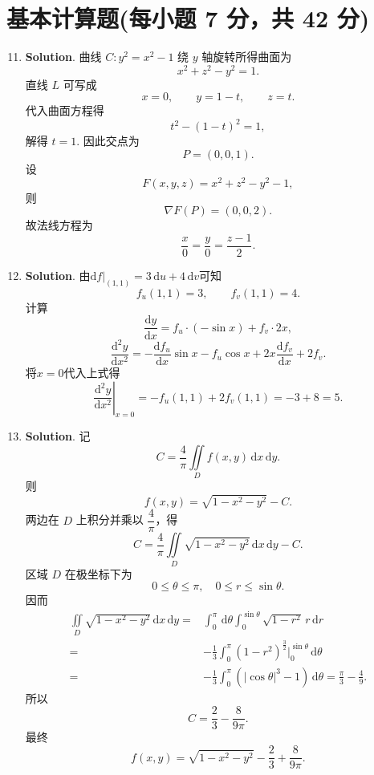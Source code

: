 \documentclass[../main.tex]{subfiles}
\begin{document}
\section{基本计算题(每小题 7 分，共 42 分)}
\begin{enumerate}
  \setcounter{enumi}{10}
  \item \textbf{Solution}. 曲线 \(C:y^2=x^2-1\) 绕 \(y\) 轴旋转所得曲面为
        \[
          x^2+z^2-y^2=1.
        \]
        直线 \(L\) 可写成
        \[
          x=0,\qquad y=1-t,\qquad z=t.
        \]
        代入曲面方程得
        \[
          t^2-(1-t)^2=1,
        \]
        解得 \(t=1\). 因此交点为
        \[
          P=(0,0,1).
        \]
        设
        \[
          F(x,y,z)=x^2+z^2-y^2-1,
        \]
        则
        \[
          \nabla F(P)=(0,0,2).
        \]
        故法线方程为
        \[
          \frac{x}{0}=\frac{y}{0}=\frac{z-1}{2}.
        \]

  \item \textbf{Solution}. 由$\left.\mathrm{d}f\right|_{(1,1)}=3\,\mathrm{d}u+4\,\mathrm{d}v$可知
        \[
          f_u(1,1)=3,\qquad f_v(1,1)=4.
        \]
        计算
        \[
          \frac{\mathrm{d}y}{\mathrm{d}x}=f_u \cdot (-\sin x)+f_v \cdot 2x,
        \]
        \[
          \frac{\mathrm{d}^2 y}{\mathrm{d}x^2}=-\frac{\mathrm{d}f_u}{\mathrm{d}x}\sin x-f_u\cos x + 2x\frac{\mathrm{d}f_v}{\mathrm{d}x} + 2f_v.
        \]
        将$x=0$代入上式得
        \[
          \left.\frac{\mathrm{d}^2 y}{\mathrm{d}x^2}\right|_{x=0}=-f_u(1,1)+2f_v(1,1)=-3+8=5.
        \]

  \item \textbf{Solution}. 记
        \[
          C=\frac{4}{\pi}\iint\limits_{D} f(x,y)\,\mathrm{d}x\,\mathrm{d}y.
        \]
        则
        \[
          f(x,y)=\sqrt{1-x^2-y^2}-C.
        \]
        两边在 \(D\) 上积分并乘以 \(\dfrac4\pi\)，得
        \[
          C=\frac{4}{\pi}\iint\limits_D\sqrt{1-x^2-y^2}\,\mathrm{d}x\,\mathrm{d}y-C.
        \]
        区域 \(D\) 在极坐标下为
        \[
          0\le \theta\le \pi,\quad 0\le r\le \sin\theta.
        \]
        因而
        \[
          \begin{aligned}
            \iint\limits_D\sqrt{1-x^2-y^2}\,\mathrm{d}x\,\mathrm{d}y
                                                                     = {} & \int_0^\pi\,\mathrm{d}\theta\int_0^{\sin\theta}\sqrt{1-r^2}\,r\,\mathrm{d}r                    \\
            = {}                                                     & -\frac{1}{3}\int_{0}^{\pi}\left(1-r^2\right)^{\frac{3}{2}}\bigg|_{0}^{\sin\theta}\,\mathrm{d}\theta \\
            = {}                                                     & -\frac{1}{3}\int_0^\pi\left(|\cos\theta|^3-1\right)\,\mathrm{d}\theta=\frac{\pi}{3}-\frac{4}{9}.
          \end{aligned}
        \]
        所以
        \[
          C=\frac{2}{3}-\frac{8}{9\pi}.
        \]
        最终
        \[
          f(x,y)=\sqrt{1-x^2-y^2}-\frac23+\frac{8}{9\pi}.
        \]


\end{enumerate}
\end{document}
